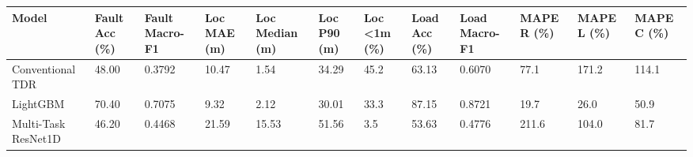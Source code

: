 \begin{tabular}{llllllllllll}
\toprule
Model & Fault Acc (\%) & Fault Macro-F1 & Loc MAE (m) & Loc Median (m) & Loc P90 (m) & Loc <1m (\%) & Load Acc (\%) & Load Macro-F1 & MAPE R (\%) & MAPE L (\%) & MAPE C (\%) \\
\midrule
Conventional TDR & 48.00 & 0.3792 & 10.47 & 1.54 & 34.29 & 45.2 & 63.13 & 0.6070 & 77.1 & 171.2 & 114.1 \\
LightGBM & 70.40 & 0.7075 & 9.32 & 2.12 & 30.01 & 33.3 & 87.15 & 0.8721 & 19.7 & 26.0 & 50.9 \\
Multi-Task ResNet1D & 46.20 & 0.4468 & 21.59 & 15.53 & 51.56 & 3.5 & 53.63 & 0.4776 & 211.6 & 104.0 & 81.7 \\
\bottomrule
\end{tabular}
